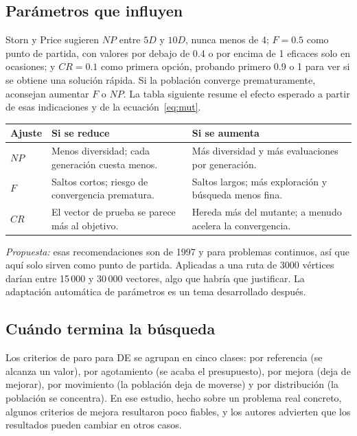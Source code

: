 \documentclass[letterpaper,12pt]{report}
\begin{document}
\subsection{Parámetros que influyen}
Storn y Price sugieren $NP$ entre $5D$ y $10D$, nunca menos de 4; $F=0.5$ como punto de partida, con valores por debajo de 0.4 o por encima de 1 eficaces solo en ocasiones; y $CR=0.1$ como primera opción, probando primero 0.9 o 1 para ver si se obtiene una solución rápida. Si la población converge prematuramente, aconsejan aumentar $F$ o $NP$. La tabla siguiente resume el efecto esperado a partir de esas indicaciones y de la ecuación~\eqref{eq:mut}.

\begin{center}
\small
\begin{tabular}{@{}P{1.5cm}P{7.1cm}P{7.1cm}@{}}
\toprule
\textbf{Ajuste} & \textbf{Si se reduce} & \textbf{Si se aumenta}\\
\midrule
$NP$ & Menos diversidad; cada generación cuesta menos. & Más diversidad y más evaluaciones por generación.\\
$F$ & Saltos cortos; riesgo de convergencia prematura. & Saltos largos; más exploración y búsqueda menos fina.\\
$CR$ & El vector de prueba se parece más al objetivo. & Hereda más del mutante; a menudo acelera la convergencia.\\
\bottomrule
\end{tabular}
\end{center}

\emph{Propuesta:} esas recomendaciones son de 1997 y para problemas continuos, así que aquí solo sirven como punto de partida. Aplicadas a una ruta de 3000 vértices darían entre 15\,000 y 30\,000 vectores, algo que habría que justificar. La adaptación automática de parámetros es un tema desarrollado después.

\subsection{Cuándo termina la búsqueda}
Los criterios de paro para DE se agrupan en cinco clases: por referencia (se alcanza un valor), por agotamiento (se acaba el presupuesto), por mejora (deja de mejorar), por movimiento (la población deja de moverse) y por distribución (la población se concentra). En ese estudio, hecho sobre un problema real concreto, algunos criterios de mejora resultaron poco fiables, y los autores advierten que los resultados pueden cambiar en otros casos.
\end{document}
